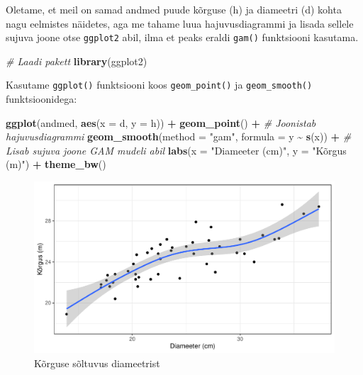 \documentclass[
]{book}
\newenvironment{Shaded}{\begin{snugshade}}{\end{snugshade}}
\newcommand{\AttributeTok}[1]{\textcolor[rgb]{0.13,0.29,0.53}{#1}}
\newcommand{\CommentTok}[1]{\textcolor[rgb]{0.56,0.35,0.01}{\textit{#1}}}
\newcommand{\FunctionTok}[1]{\textcolor[rgb]{0.13,0.29,0.53}{\textbf{#1}}}
\newcommand{\NormalTok}[1]{#1}
\newcommand{\SpecialCharTok}[1]{\textcolor[rgb]{0.81,0.36,0.00}{\textbf{#1}}}
\newcommand{\StringTok}[1]{\textcolor[rgb]{0.31,0.60,0.02}{#1}}
\renewenvironment{Shaded} {\begin{snugshade}\footnotesize} {\end{snugshade}}
\begin{document}
Oletame, et meil on samad andmed puude kõrguse (h) ja diameetri (d) kohta nagu eelmistes näidetes, aga me tahame luua hajuvusdiagrammi ja lisada sellele sujuva joone otse \texttt{ggplot2} abil, ilma et peaks eraldi \texttt{gam()} funktsiooni kasutama.

\begin{Shaded}
\begin{Highlighting}[]
\CommentTok{\# Laadi pakett}
\FunctionTok{library}\NormalTok{(ggplot2)}
\end{Highlighting}
\end{Shaded}

Kasutame \texttt{ggplot()} funktsiooni koos \texttt{geom\_point()} ja \texttt{geom\_smooth()} funktsioonidega:

\begin{Shaded}
\begin{Highlighting}[]
\FunctionTok{ggplot}\NormalTok{(andmed, }\FunctionTok{aes}\NormalTok{(}\AttributeTok{x =}\NormalTok{ d, }\AttributeTok{y =}\NormalTok{ h)) }\SpecialCharTok{+}
  \FunctionTok{geom\_point}\NormalTok{() }\SpecialCharTok{+}  \CommentTok{\# Joonistab hajuvusdiagrammi}
  \FunctionTok{geom\_smooth}\NormalTok{(}\AttributeTok{method =} \StringTok{"gam"}\NormalTok{, }\AttributeTok{formula =}\NormalTok{ y }\SpecialCharTok{\textasciitilde{}} \FunctionTok{s}\NormalTok{(x)) }\SpecialCharTok{+}  \CommentTok{\# Lisab sujuva joone GAM mudeli abil}
  \FunctionTok{labs}\NormalTok{(}\AttributeTok{x =} \StringTok{"Diameeter (cm)"}\NormalTok{, }\AttributeTok{y =} \StringTok{"Kõrgus (m)"}\NormalTok{) }\SpecialCharTok{+}
  \FunctionTok{theme\_bw}\NormalTok{()}
\end{Highlighting}
\end{Shaded}

\begin{figure}[H]
\includegraphics[width=0.8\linewidth]{_main_files/figure-latex/unnamed-chunk-78-1} \caption{Kõrguse sõltuvus diameetrist}\label{fig:unnamed-chunk-78}
\end{figure}
\end{document}
